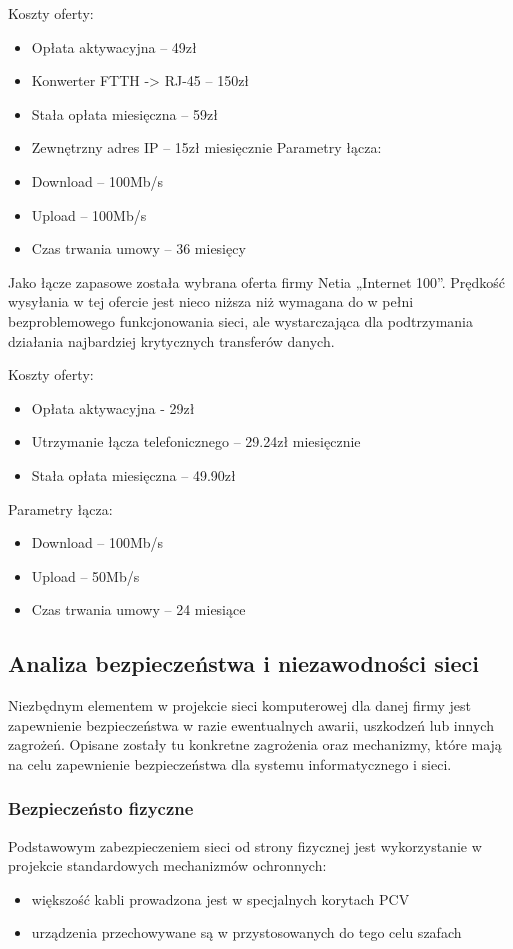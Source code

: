 \documentclass{article}
\begin{document}
Koszty oferty:
\begin{itemize}
	\item Opłata aktywacyjna – 49zł
\item	Konwerter FTTH -> RJ-45 – 150zł
	\item	Stała opłata miesięczna – 59zł
	\item Zewnętrzny adres IP – 15zł miesięcznie
	Parametry łącza:
	\item	Download – 100Mb/s
	\item Upload – 100Mb/s
	\item Czas trwania umowy – 36 miesięcy
\end{itemize}


Jako łącze zapasowe została wybrana oferta firmy Netia „Internet 100”.  Prędkość wysyłania w tej ofercie jest nieco niższa niż wymagana do w pełni bezproblemowego funkcjonowania sieci, ale wystarczająca dla podtrzymania działania najbardziej krytycznych transferów danych. 

Koszty oferty:
\begin{itemize}
\item 	Opłata aktywacyjna - 29zł
\item 	Utrzymanie łącza telefonicznego – 29.24zł miesięcznie
\item 	Stała opłata miesięczna – 49.90zł
\end{itemize}


Parametry łącza:
\begin{itemize}
\item 	Download – 100Mb/s
\item 	Upload – 50Mb/s
\item 	Czas trwania umowy – 24 miesiące
\end{itemize}



\subsection{Analiza bezpieczeństwa i niezawodności sieci}
Niezbędnym elementem w projekcie sieci komputerowej dla danej firmy jest zapewnienie bezpieczeństwa w razie ewentualnych awarii, uszkodzeń lub innych zagrożeń. Opisane zostały tu konkretne zagrożenia oraz mechanizmy, które mają na celu zapewnienie bezpieczeństwa dla systemu informatycznego i sieci.

\subsubsection{Bezpieczeństo fizyczne}
Podstawowym zabezpieczeniem sieci od strony fizycznej jest wykorzystanie w projekcie standardowych mechanizmów
ochronnych:
\begin{itemize}
	\item większość kabli prowadzona jest w specjalnych korytach PCV
	\item urządzenia przechowywane są w przystosowanych do tego celu szafach
\end{itemize}
\end{document}
